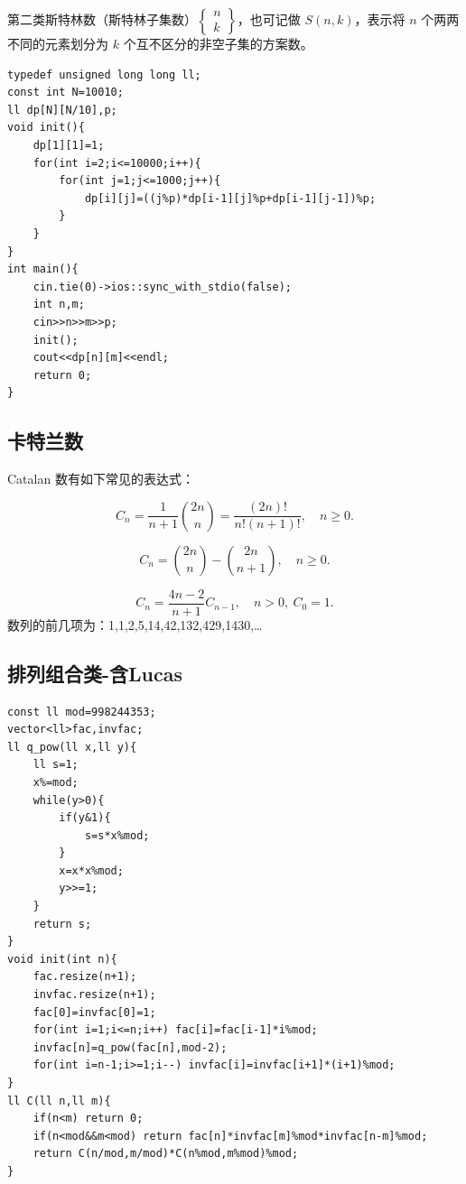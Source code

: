 \documentclass[11pt,a4paper,twocolumn]{ctexart}  %
\begin{document}
第二类斯特林数（斯特林子集数）\(\begin{Bmatrix}n\\ k\end{Bmatrix}\)，也可记做 \(S(n,k)\)，表示将 \(n\) 个两两不同的元素划分为 \(k\) 个互不区分的非空子集的方案数。

\begin{lstlisting}[caption={Stirling 数},label={lst:Stirling 数},basicstyle=\ttfamily]
typedef unsigned long long ll;
const int N=10010;
ll dp[N][N/10],p;
void init(){
    dp[1][1]=1;
    for(int i=2;i<=10000;i++){
        for(int j=1;j<=1000;j++){
            dp[i][j]=((j%p)*dp[i-1][j]%p+dp[i-1][j-1])%p;
        }
    }
}
int main(){
    cin.tie(0)->ios::sync_with_stdio(false);
    int n,m;
    cin>>n>>m>>p;
    init();
    cout<<dp[n][m]<<endl;
    return 0;
}
\end{lstlisting}

\newpage
\subsection{卡特兰数}
Catalan 数有如下常见的表达式：

\[
C_n = \frac{1}{n+1}\binom{2n}{n} = \frac{(2n)!}{n!(n+1)!},\quad n\ge 0. \tag{2}
\]

\[
C_n = \binom{2n}{n} - \binom{2n}{n+1},\quad n \ge 0. \tag{3}
\]

\[
C_n = \frac{4n-2}{n+1}C_{n-1},\quad n>0,\ C_0=1. \tag{4}
\]
数列的前几项为：1,1,2,5,14,42,132,429,1430,…
\subsection{排列组合类-含Lucas}
\begin{lstlisting}
const ll mod=998244353;
vector<ll>fac,invfac;
ll q_pow(ll x,ll y){
    ll s=1;
    x%=mod;
    while(y>0){
        if(y&1){
            s=s*x%mod;
        }
        x=x*x%mod;
        y>>=1;
    }
    return s;
}
void init(int n){
    fac.resize(n+1);
    invfac.resize(n+1);
    fac[0]=invfac[0]=1;
    for(int i=1;i<=n;i++) fac[i]=fac[i-1]*i%mod;
    invfac[n]=q_pow(fac[n],mod-2);
    for(int i=n-1;i>=1;i--) invfac[i]=invfac[i+1]*(i+1)%mod;
}
ll C(ll n,ll m){
    if(n<m) return 0;
    if(n<mod&&m<mod) return fac[n]*invfac[m]%mod*invfac[n-m]%mod;
    return C(n/mod,m/mod)*C(n%mod,m%mod)%mod;
}
\end{lstlisting}
\end{document}
